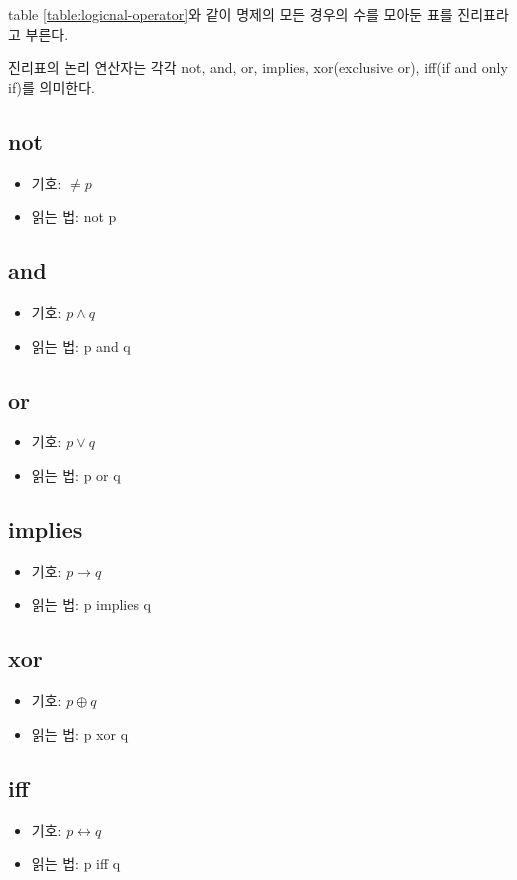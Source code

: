 \documentclass[../note.tex]{subfiles}
\begin{document}
table \ref{table:logicnal-operator}와 같이 명제의 모든 경우의 수를 모아둔 표를 진리표라고 부른다.

진리표의 논리 연산자는 각각 not, and, or, implies, xor(exclusive or), iff(if and only if)를 의미한다.
\subsection{not}
\begin{itemize}
  \item
    기호: $\neq p$
  \item
    읽는 법: not p
\end{itemize}
\subsection{and}
\begin{itemize}
  \item
    기호: $p \land q$
  \item
    읽는 법: p and q
\end{itemize}
\subsection{or}
\begin{itemize}
  \item
    기호: $p \lor q$
  \item
    읽는 법: p or q
\end{itemize}
\subsection{implies}
\begin{itemize}
  \item
    기호: $p \rightarrow q$
  \item
    읽는 법: p implies q
\end{itemize}
\subsection{xor}
\begin{itemize}
  \item
    기호: $p \oplus q$
  \item
    읽는 법: p xor q
\end{itemize}
\subsection{iff}
\begin{itemize}
  \item
    기호: $p \longleftrightarrow q$
  \item
    읽는 법: p iff q
\end{itemize}
\end{document}
